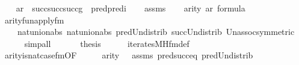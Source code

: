 \begin{isabellebody}
\ \ \isamarkupfalse%
\ {\isacharquery}{\kern0pt}ar\ {\isacharequal}{\kern0pt}\ {\isachardoublequoteopen}succ{\isacharparenleft}{\kern0pt}succ{\isacharparenleft}{\kern0pt}succ{\isacharparenleft}{\kern0pt}g{\isacharparenright}{\kern0pt}{\isacharparenright}{\kern0pt}{\isacharparenright}{\kern0pt}\ {\isasymunion}\ pred{\isacharparenleft}{\kern0pt}pred{\isacharparenleft}{\kern0pt}i{\isacharparenright}{\kern0pt}{\isacharparenright}{\kern0pt}{\isachardoublequoteclose}\isanewline
\ \ \isamarkupfalse%
\ assms\isanewline
\ \ \isamarkupfalse%
\ {\isachardoublequoteopen}arity{\isacharparenleft}{\kern0pt}{\isacharquery}{\kern0pt}{\isasymphi}{\isacharparenright}{\kern0pt}\ {\isacharequal}{\kern0pt}{\isacharquery}{\kern0pt}ar{\isachardoublequoteclose}\ {\isachardoublequoteopen}{\isacharquery}{\kern0pt}{\isasymphi}{\isasymin}formula{\isachardoublequoteclose}\ \isanewline
\ \ \ \ \isamarkupfalse%
\ arity{\isacharunderscore}{\kern0pt}fun{\isacharunderscore}{\kern0pt}apply{\isacharunderscore}{\kern0pt}fm\isanewline
\ \ \ \ nat{\isacharunderscore}{\kern0pt}union{\isacharunderscore}{\kern0pt}abs{}\ nat{\isacharunderscore}{\kern0pt}union{\isacharunderscore}{\kern0pt}abs{}\ pred{\isacharunderscore}{\kern0pt}Un{\isacharunderscore}{\kern0pt}distrib\ succ{\isacharunderscore}{\kern0pt}Un{\isacharunderscore}{\kern0pt}distrib\ Un{\isacharunderscore}{\kern0pt}assoc{\isacharbrackleft}{\kern0pt}symmetric{\isacharbrackright}{\kern0pt}\isanewline
\ \ \ \ \isamarkupfalse%
\ simp{\isacharunderscore}{\kern0pt}all\isanewline
\ \ \isamarkupfalse%
\isanewline
\ \ \isamarkupfalse%
\ {\isacharquery}{\kern0pt}thesis\isanewline
\ \ \ \ \isamarkupfalse%
\ iterates{\isacharunderscore}{\kern0pt}MH{\isacharunderscore}{\kern0pt}fm{\isacharunderscore}{\kern0pt}def\isanewline
\ \ \ \ \isamarkupfalse%
\ arity{\isacharunderscore}{\kern0pt}is{\isacharunderscore}{\kern0pt}nat{\isacharunderscore}{\kern0pt}case{\isacharunderscore}{\kern0pt}fm{\isacharbrackleft}{\kern0pt}OF\ {\isacartoucheopen}{\isacharquery}{\kern0pt}{\isasymphi}{\isasymin}{\isacharunderscore}{\kern0pt}{\isacartoucheclose}\ {\isacharunderscore}{\kern0pt}\ {\isacharunderscore}{\kern0pt}\ {\isacharunderscore}{\kern0pt}\ {\isacharunderscore}{\kern0pt}\ {\isacartoucheopen}arity{\isacharparenleft}{\kern0pt}{\isacharquery}{\kern0pt}{\isasymphi}{\isacharparenright}{\kern0pt}\ {\isacharequal}{\kern0pt}\ {\isacharunderscore}{\kern0pt}{\isacartoucheclose}{\isacharbrackright}{\kern0pt}\ assms\ pred{\isacharunderscore}{\kern0pt}succ{\isacharunderscore}{\kern0pt}eq\ pred{\isacharunderscore}{\kern0pt}Un{\isacharunderscore}{\kern0pt}distrib\isanewline

\end{isabellebody}
